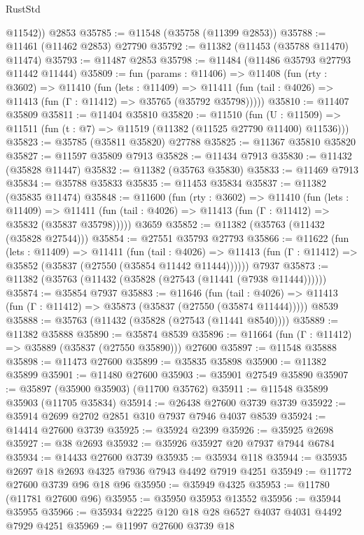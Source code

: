 \begin{lexlean}{RustStd}
\begin{coremodule}
        @11542))
    @2853
@35785 := @11548 (@35758 (@11399 @2853))
@35788 := @11461 (@11462 @2853) @27790
@35792 := @11382 (@11453 (@35788 @11470) @11474)
@35793 := @11487 @2853
@35798 := @11484 (@11486 @35793 @27793 @11442 @11444)
@35809 := fun (params : @11406) =>
  @11408
    (fun (rty : @3602) =>
    @11410
      (fun (lets : @11409) =>
      @11411 (fun (tail : @4026) => @11413 (fun (Γ : @11412) => @35765 (@35792 @35798)))))
@35810 := @11407 @35809
@35811 := @11404 @35810
@35820 := @11510
    (fun (U : @11509) => @11511 (fun (t : @7) => @11519 (@11382 (@11525 @27790 @11400) @11536)))
@35823 := @35785 (@35811 @35820) @27788
@35825 := @11367 @35810 @35820
@35827 := @11597 @35809 @7913
@35828 := @11434 @7913
@35830 := @11432 (@35828 @11447)
@35832 := @11382 (@35763 @35830)
@35833 := @11469 @7913
@35834 := @35788 @35833
@35835 := @11453 @35834
@35837 := @11382 (@35835 @11474)
@35848 := @11600
    (fun (rty : @3602) =>
    @11410
      (fun (lets : @11409) =>
      @11411 (fun (tail : @4026) => @11413 (fun (Γ : @11412) => @35832 (@35837 @35798)))))
    @3659
@35852 := @11382 (@35763 (@11432 (@35828 @27544)))
@35854 := @27551 @35793 @27793
@35866 := @11622
    (fun (lets : @11409) =>
    @11411
      (fun (tail : @4026) =>
      @11413 (fun (Γ : @11412) => @35852 (@35837 (@27550 (@35854 @11442 @11444))))))
    @7937
@35873 := @11382 (@35763 (@11432 (@35828 (@27543 (@11441 (@7938 @11444))))))
@35874 := @35854 @7937
@35883 := @11646
    (fun (tail : @4026) => @11413 (fun (Γ : @11412) => @35873 (@35837 (@27550 (@35874 @11444)))))
    @8539
@35888 := @35763 (@11432 (@35828 (@27543 (@11441 @8540))))
@35889 := @11382 @35888
@35890 := @35874 @8539
@35896 := @11664 (fun (Γ : @11412) => @35889 (@35837 (@27550 @35890))) @27600
@35897 := @11548 @35888
@35898 := @11473 @27600
@35899 := @35835 @35898
@35900 := @11382 @35899
@35901 := @11480 @27600
@35903 := @35901 @27549 @35890
@35907 := @35897 (@35900 @35903) (@11700 @35762)
@35911 := @11548 @35899 @35903 (@11705 @35834)
@35914 := @26438 @27600 @3739 @3739
@35922 := @35914 @2699 @2702 @2851 @310 @7937 @7946 @4037 @8539
@35924 := @14414 @27600 @3739
@35925 := @35924 @2399
@35926 := @35925 @2698
@35927 := @38 @2693
@35932 := @35926 @35927 @20 @7937 @7944 @6784
@35934 := @14433 @27600 @3739
@35935 := @35934 @118
@35944 := @35935 @2697 @18 @2693 @4325 @7936 @7943 @4492 @7919 @4251
@35949 := @11772 @27600 @3739 @96 @18 @96
@35950 := @35949 @4325
@35953 := @11780 (@11781 @27600 @96)
@35955 := @35950 @35953 @13552
@35956 := @35944 @35955
@35966 := @35934 @2225 @120 @18 @28 @6527 @4037 @4031 @4492 @7929 @4251
@35969 := @11997 @27600 @3739 @18

\end{coremodule}
\end{lexlean}
